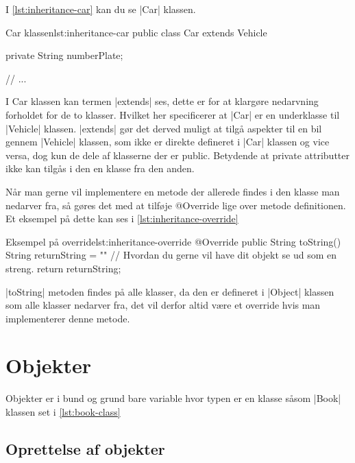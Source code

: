 I \autoref{lst:inheritance-car} kan du se \JavaInline|Car| klassen.

\begin{JavaCode}{Car klassen}{lst:inheritance-car}
	public class Car extends Vehicle {

		private String numberPlate;

		// ...
	}
\end{JavaCode}

I Car klassen kan termen \JavaInline|extends| ses, dette er for at
klargøre nedarvning forholdet for de to klasser. Hvilket her
specificerer at \JavaInline|Car| er en underklasse til
\JavaInline|Vehicle| klassen. \JavaInline|extends| gør det derved
muligt at tilgå aspekter til en bil gennem \JavaInline|Vehicle|
klassen, som ikke er direkte defineret i \JavaInline|Car| klassen og
vice versa, dog kun de dele af klasserne der er public. Betydende at
private attributter ikke kan tilgås i den en klasse fra den anden.

Når man gerne vil implementere en metode der allerede findes i den
klasse man nedarver fra, så gøres det med at tilføje @Override lige
over metode definitionen. Et eksempel på dette kan ses i
\autoref{lst:inheritance-override}

\begin{JavaCode}{Eksempel på override}{lst:inheritance-override}
	@Override
	public String toString() {
		String returnString = ""   // Hvordan du gerne vil have dit objekt se ud som en streng.
		return returnString;
	}
\end{JavaCode}

\JavaInline|toString| metoden findes på alle klasser, da den er
defineret i \JavaInline|Object| klassen som alle klasser nedarver fra,
det vil derfor altid være et override hvis man implementerer denne
metode.






\section{Objekter}

Objekter er i bund og grund bare variable hvor typen er en klasse
såsom \JavaInline|Book| klassen set i \autoref{lst:book-class}

\subsection{Oprettelse af objekter}

